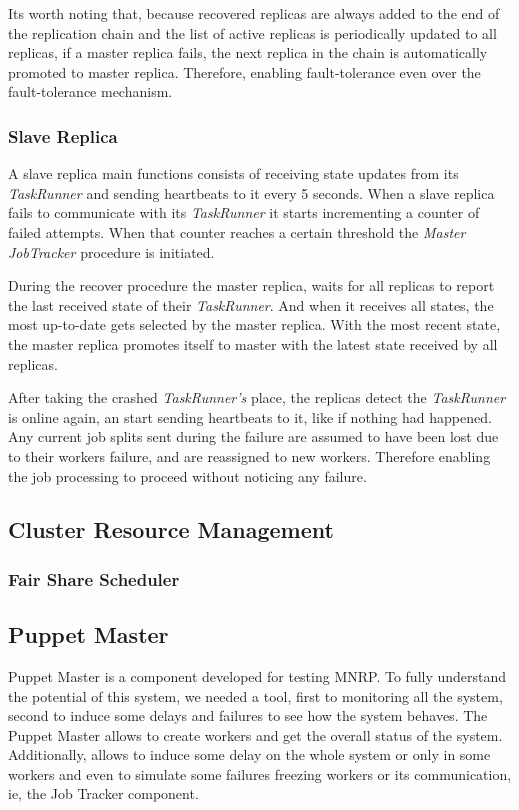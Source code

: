 \documentclass[times, 10pt,twocolumn]{article}
\begin{document}
            Its worth noting that, because recovered replicas are always added to the end of the replication chain and the list of active replicas is periodically updated to all replicas, if a master replica fails, the next replica in the chain is automatically promoted to master replica. Therefore, enabling fault-tolerance even over the fault-tolerance mechanism.
        	
        	\subsubsection{Slave Replica}\label{slave-replica}
            
            A slave replica main functions consists of receiving state updates from its \textit{TaskRunner} and sending heartbeats to it every 5 seconds. When a slave replica fails to communicate with its \textit{TaskRunner} it starts incrementing a counter of failed attempts. When that counter reaches a certain threshold the \textit{Master JobTracker} procedure is initiated.
            
            During the recover procedure the master replica, waits for all replicas to report the last received state of their \textit{TaskRunner}. And when it receives all states, the most up-to-date gets selected by the master replica. With the most recent state, the master replica promotes itself to master with the latest state received by all replicas.
            
            After taking the crashed \textit{TaskRunner's} place, the replicas detect the \textit{TaskRunner} is online again, an start sending heartbeats to it, like if nothing had happened. Any current job splits sent during the failure are assumed to have been lost due to their workers failure, and are reassigned to new workers. Therefore enabling the job processing to proceed without noticing any failure.
    	
    	\subsection{Cluster Resource Management}\label{cluster-man}
    	
            \subsubsection{Fair Share Scheduler}
        
    	\subsection{Puppet Master}
	      Puppet Master is a component developed for testing \ac{MNRP}. To fully understand the potential of this system, we needed a tool, first to monitoring all the system, second to induce some delays and failures to see how the system behaves. The Puppet Master allows to create workers and get the overall status of the system. Additionally, allows to induce some delay on the whole system or only in some workers and even to simulate some failures freezing workers or its communication, ie, the Job Tracker component.
\end{document}
